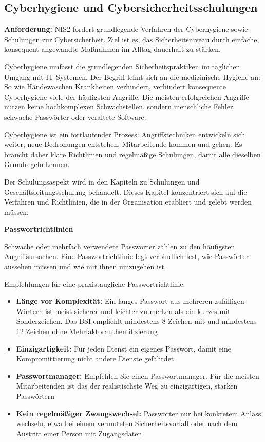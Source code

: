 \newpage
\subsection{Cyberhygiene und Cybersicherheitsschulungen}

\textbf{Anforderung:} NIS2 fordert grundlegende Verfahren der Cyberhygiene sowie Schulungen zur Cybersicherheit. Ziel ist es, das Sicherheitsniveau durch einfache, konsequent angewandte Maßnahmen im Alltag dauerhaft zu stärken.

Cyberhygiene umfasst die grundlegenden Sicherheitspraktiken im täglichen Umgang mit IT-Systemen. Der Begriff lehnt sich an die medizinische Hygiene an: So wie Händewaschen Krankheiten verhindert, verhindert konsequente Cyberhygiene viele der häufigsten Angriffe. Die meisten erfolgreichen Angriffe nutzen keine hochkomplexen Schwachstellen, sondern menschliche Fehler, schwache Passwörter oder veraltete Software.

Cyberhygiene ist ein fortlaufender Prozess: Angriffstechniken entwickeln sich weiter, neue Bedrohungen entstehen, Mitarbeitende kommen und gehen. Es braucht daher klare Richtlinien und regelmäßige Schulungen, damit alle dieselben Grundregeln kennen.

Der Schulungsaspekt wird in den Kapiteln zu Schulungen und Geschäftsleitungsschulung behandelt. Dieses Kapitel konzentriert sich auf die Verfahren und Richtlinien, die in der Organisation etabliert und gelebt werden müssen.

\textbf{Passwortrichtlinien}

Schwache oder mehrfach verwendete Passwörter zählen zu den häufigsten Angriffsursachen. Eine Passwortrichtlinie legt verbindlich fest, wie Passwörter aussehen müssen und wie mit ihnen umzugehen ist.

Empfehlungen für eine praxistaugliche Passwortrichtlinie:

\begin{itemize}
    \item \textbf{Länge vor Komplexität:} Ein langes Passwort aus mehreren zufälligen Wörtern ist meist sicherer und leichter zu merken als ein kurzes mit Sonderzeichen. Das BSI empfiehlt mindestens 8 Zeichen mit und mindestens 12 Zeichen ohne Mehrfaktorauthentifizierung
    \item \textbf{Einzigartigkeit:} Für jeden Dienst ein eigenes Passwort, damit eine Kompromittierung nicht andere Dienste gefährdet
    \item \textbf{Passwortmanager:} Empfehlen Sie einen Passwortmanager. Für die meisten Mitarbeitenden ist das der realistischste Weg zu einzigartigen, starken Passwörtern
    \item \textbf{Kein regelmäßiger Zwangswechsel:} Passwörter nur bei konkretem Anlass wechseln, etwa bei einem vermuteten Sicherheitsvorfall oder nach dem Austritt einer Person mit Zugangsdaten
\end{itemize}

